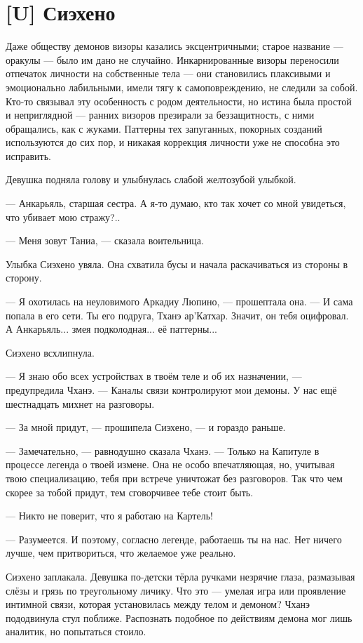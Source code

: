 \section{[U] Сиэхено}

\textspace

Даже обществу демонов визоры казались эксцентричными;
старое название --- оракулы --- было им дано не случайно.
Инкарнированные визоры переносили отпечаток личности на собственные тела --- они становились плаксивыми и эмоционально лабильными, имели тягу к самоповреждению, не следили за собой.
Кто-то связывал эту особенность с родом деятельности, но истина была простой и неприглядной --- ранних визоров презирали за беззащитность, с ними обращались, как с жуками.
Паттерны тех запуганных, покорных созданий используются до сих пор, и никакая коррекция личности уже не способна это исправить.

Девушка подняла голову и улыбнулась слабой желтозубой улыбкой.

--- Анкарьяль, старшая сестра.
А я-то думаю, кто так хочет со мной увидеться, что убивает мою стражу?..

--- Меня зовут Таниа, --- сказала воительница.

Улыбка Сиэхено увяла.
Она схватила бусы и начала раскачиваться из стороны в сторону.

--- Я охотилась на неуловимого Аркадиу Люпино, --- прошептала она.
--- И сама попала в его сети.
Ты его подруга, Тханэ ар'Катхар.
Значит, он тебя оцифровал.
А Анкарьяль... змея подколодная... её паттерны...

Сиэхено всхлипнула.

--- Я знаю обо всех устройствах в твоём теле и об их назначении, --- предупредила Чханэ.
--- Каналы связи контролируют мои демоны.
У нас ещё шестнадцать михнет на разговоры.

--- За мной придут, --- прошипела Сиэхено, --- и гораздо раньше.

--- Замечательно, --- равнодушно сказала Чханэ.
--- Только на Капитуле в процессе легенда о твоей измене.
Она не особо впечатляющая, но, учитывая твою специализацию, тебя при встрече уничтожат без разговоров.
Так что чем скорее за тобой придут, тем сговорчивее тебе стоит быть.

--- Никто не поверит, что я работаю на Картель!

--- Разумеется.
И поэтому, согласно легенде, работаешь ты на нас.
Нет ничего лучше, чем притвориться, что желаемое уже реально.

Сиэхено заплакала.
Девушка по-детски тёрла ручками незрячие глаза, размазывая слёзы и грязь по треугольному личику.
Что это --- умелая игра или проявление интимной связи, которая установилась между телом и демоном?
Чханэ пододвинула стул поближе.
Распознать подобное по действиям демона мог лишь аналитик, но попытаться стоило.


